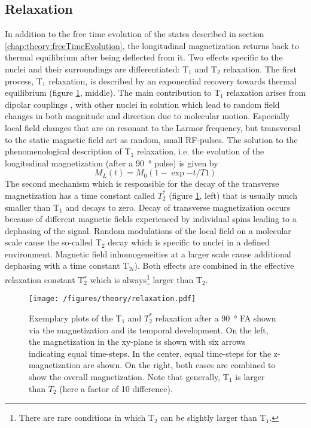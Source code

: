         \subsection{Relaxation}
        \label{chapter:theory:relaxation}
    In addition to the free time evolution of the states described in section \ref{chap:theory:freeTimeEvolution}, the longitudinal magnetization returns back to thermal equilibrium after being deflected from it. Two effects specific to the nuclei and their surroundings are differentiated: T$_1$ and T$_2$ relaxation. The first process, T$_1$ relaxation, is described by an exponential recovery towards thermal equilibrium (figure \ref{theory:figure:relaxation}, middle).
    The main contribution to T$_1$ relaxation arises from dipolar couplings \cite{levitt_spin_nodate}, with other nuclei in solution which lead to random field changes in both magnitude and direction due to molecular motion. Especially local field changes that are on resonant to the Larmor frequency, but transversal to the static magnetic field act as random, small RF-pulses. The solution to the phenomenological description of T$_1$ relaxation, i.e. the  evolution of the longitudinal magnetization (after a \SI{90}{\degree} pulse) is given by
        \begin{equation}
            M_L(t) = M_0(1 - \exp{-t/T1})
        \end{equation}
        The second mechanism which is responsible for the decay of the transverse magnetization has a time constant called $T_2^*$ (figure \ref{theory:figure:relaxation}, left) that is usually much smaller than T$_1$ \cite{levitt_spin_nodate} and decays to zero. Decay of transverse magnetization occurs because of different magnetic fields experienced by individual spins leading to a dephasing of the signal. Random modulations of the local field on a molecular scale cause the so-called T$_2$ decay which is specific to nuclei in a defined environment. Magnetic field inhomogeneities at a larger scale cause additional dephasing with a time constant T$_{2i}$). Both effects are combined in the effective relaxation constant T$_2^*$ \cite{chavhan_principles_2009} which is always\footnote[1]{There are rare conditions in which T$_2$ can be slightly larger than T$_1$.} larger than T$_2$.
            \begin{figure}
                \centering
                \texttt{[image: /figures/theory/relaxation.pdf]}
                \caption[Relaxation in NMR]{Exemplary plots of the T$_1$ and $T_2^*$ relaxation after a \SI{90}{\degree} FA shown via the magnetization and its temporal development. On the left, the magnetization in the xy-plane is shown with six arrows indicating equal time-steps. In the center, equal time-steps for the z-magnetization are shown. On the right, both cases are combined to show the overall magnetization. Note that generally, T$_1$ is larger than $T_2$ (here a factor of 10 difference).}
                \label{theory:figure:relaxation}
            \end{figure}
